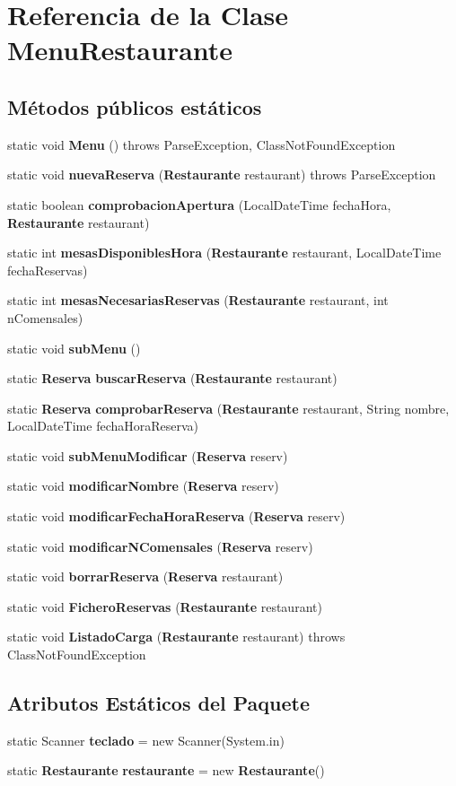 \section{Referencia de la Clase MenuRestaurante}
\label{class_menu_restaurante}
\subsection*{Métodos públicos estáticos}
\begin{CompactItemize}
\item 
static void {\bf Menu} ()  throws ParseException, ClassNotFoundException 
\item 
static void {\bf nuevaReserva} ({\bf Restaurante} restaurant)  throws ParseException 
\item 
static boolean {\bf comprobacionApertura} (LocalDateTime fechaHora, {\bf Restaurante} restaurant)
\item 
static int {\bf mesasDisponiblesHora} ({\bf Restaurante} restaurant, LocalDateTime fechaReservas)
\item 
static int {\bf mesasNecesariasReservas} ({\bf Restaurante} restaurant, int nComensales)
\item 
static void {\bf subMenu} ()
\item 
static {\bf Reserva} {\bf buscarReserva} ({\bf Restaurante} restaurant)
\item 
static {\bf Reserva} {\bf comprobarReserva} ({\bf Restaurante} restaurant, String nombre, LocalDateTime fechaHoraReserva)
\item 
static void {\bf subMenuModificar} ({\bf Reserva} reserv)
\item 
static void {\bf modificarNombre} ({\bf Reserva} reserv)
\item 
static void {\bf modificarFechaHoraReserva} ({\bf Reserva} reserv)
\item 
static void {\bf modificarNComensales} ({\bf Reserva} reserv)
\item 
static void {\bf borrarReserva} ({\bf Reserva} restaurant)
\item 
static void {\bf FicheroReservas} ({\bf Restaurante} restaurant)
\item 
static void {\bf ListadoCarga} ({\bf Restaurante} restaurant)  throws ClassNotFoundException 
\end{CompactItemize}
\subsection*{Atributos Estáticos del Paquete}
\begin{CompactItemize}
\item 
static Scanner {\bf teclado} = new Scanner(System.in)
\item 
static {\bf Restaurante} {\bf restaurante} = new {\bf Restaurante}()
\end{CompactItemize}


